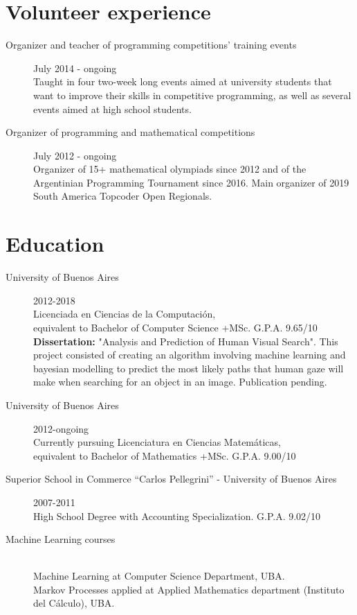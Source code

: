 \documentclass [a4paper, 11pt]{article}
\begin{document}
\section* {Volunteer experience}
\begin{description}
\item[Organizer and teacher of programming competitions' training events] {\hfill July 2014 - ongoing \\
  Taught in four two-week long events aimed at university students that 
  want to improve their skills in competitive programming, as well as 
  several events aimed at high school students.
}
\item[Organizer of programming and mathematical competitions] { \hfill July 2012 - ongoing \\
  Organizer of 15+ mathematical olympiads since 2012 and of the Argentinian Programming Tournament since 2016. Main organizer of 2019 South America Topcoder Open Regionals.
}
\end{description}

\section* {Education}
\begin{description}
  \item[University of Buenos Aires]{\hfill 2012-2018 \\
	Licenciada en Ciencias de la Computaci\'on, \\
	equivalent to Bachelor of Computer Science +MSc. G.P.A. 9.65/10 \\
    
    \textbf{Dissertation:} "Analysis and Prediction of Human Visual Search". This project consisted of creating an 
    algorithm involving machine learning and bayesian modelling to predict the most likely paths that 
    human gaze will make when searching for an object in an image. Publication pending.}

  \item[University of Buenos Aires]{\hfill 2012-ongoing \\ 
	Currently pursuing Licenciatura en Ciencias Matem\'aticas, \\
	equivalent to Bachelor of Mathematics +MSc. G.P.A. 9.00/10}
	
  \item[Superior School in Commerce ``Carlos Pellegrini'' - University of Buenos Aires] {\hfill 2007-2011 \\
	High School Degree with Accounting Specialization. G.P.A. 9.02/10}

  \item[Machine Learning courses] { \hfill \\
    Machine Learning at Computer Science Department, UBA. \\ %
    Markov Processes applied at Applied Mathematics department (Instituto del C\'alculo), UBA. \\
}

\end{description}
\end{document}
